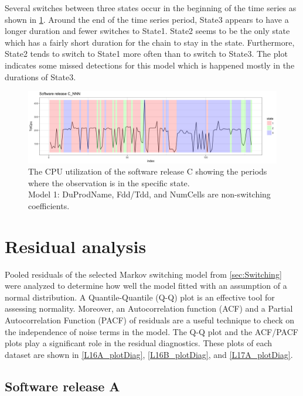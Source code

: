 Several switches between three states occur in the beginning of the
time series as shown in \ref{L17A_NNN}. Around the end of the time
series period, State3 appears to have a longer duration and fewer
switches to State1. State2 seems to be the only state which has a
fairly short duration for the chain to stay in the state. Furthermore,
State2 tends to switch to State1 more often than to switch to State3.
The plot indicates some missed detections for this model which is
happened mostly in the durations of State3. 

\begin{figure}[H]
\begin{centering}
\includegraphics[scale=0.35]{picture/L17A_NNN1}
\par\end{centering}
\caption{The CPU utilization of the software release C showing the periods
where the observation is in the specific state. \protect \\
Model 1: DuProdName, Fdd/Tdd, and NumCells are non-switching coefficients.}
\label{L17A_NNN}
\end{figure}


\section{Residual analysis\label{sec:Residual}}

Pooled residuals of the selected Markov switching model from \ref{sec:Switching}
were analyzed to determine how well the model fitted with an assumption
of a normal distribution. A Quantile-Quantile (Q-Q) plot is an effective
tool for assessing normality. Moreover, an Autocorrelation function
(ACF) and a Partial Autocorrelation Function (PACF) of residuals are
a useful technique to check on the independence of noise terms in
the model. The Q-Q plot and the ACF/PACF plots play a significant
role in the residual diagnostics. These plots of each dataset are
shown in \ref{L16A_plotDiag}, \ref{L16B_plotDiag}, and \ref{L17A_plotDiag}. 

\subsection{Software release A}

